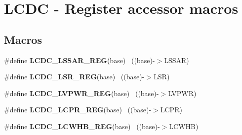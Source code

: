 \hypertarget{group___l_c_d_c___register___accessor___macros}{}\section{L\+C\+D\+C -\/ Register accessor macros}
\label{group___l_c_d_c___register___accessor___macros}
\subsection*{Macros}
\begin{DoxyCompactItemize}
\item 
\hypertarget{group___l_c_d_c___register___accessor___macros_ga57c6a32c748a29cae70d04948e97431e}{}\#define {\bfseries L\+C\+D\+C\+\_\+\+L\+S\+S\+A\+R\+\_\+\+R\+E\+G}(base)                                      ~((base)-\/$>$L\+S\+S\+A\+R)\label{group___l_c_d_c___register___accessor___macros_ga57c6a32c748a29cae70d04948e97431e}

\item 
\hypertarget{group___l_c_d_c___register___accessor___macros_ga11a21da98a3b09bc2184c255c748e3db}{}\#define {\bfseries L\+C\+D\+C\+\_\+\+L\+S\+R\+\_\+\+R\+E\+G}(base)                                          ~((base)-\/$>$L\+S\+R)\label{group___l_c_d_c___register___accessor___macros_ga11a21da98a3b09bc2184c255c748e3db}

\item 
\hypertarget{group___l_c_d_c___register___accessor___macros_ga0301ea9e18a1e38e1218853e50ff8e9c}{}\#define {\bfseries L\+C\+D\+C\+\_\+\+L\+V\+P\+W\+R\+\_\+\+R\+E\+G}(base)                                      ~((base)-\/$>$L\+V\+P\+W\+R)\label{group___l_c_d_c___register___accessor___macros_ga0301ea9e18a1e38e1218853e50ff8e9c}

\item 
\hypertarget{group___l_c_d_c___register___accessor___macros_ga17e57c13b4bd0542d61dca774ba13df5}{}\#define {\bfseries L\+C\+D\+C\+\_\+\+L\+C\+P\+R\+\_\+\+R\+E\+G}(base)                                        ~((base)-\/$>$L\+C\+P\+R)\label{group___l_c_d_c___register___accessor___macros_ga17e57c13b4bd0542d61dca774ba13df5}

\item 
\hypertarget{group___l_c_d_c___register___accessor___macros_gacee502cc916ac27603d763680a1ecdda}{}\#define {\bfseries L\+C\+D\+C\+\_\+\+L\+C\+W\+H\+B\+\_\+\+R\+E\+G}(base)                                      ~((base)-\/$>$L\+C\+W\+H\+B)\label{group___l_c_d_c___register___accessor___macros_gacee502cc916ac27603d763680a1ecdda}


\end{DoxyCompactItemize}
